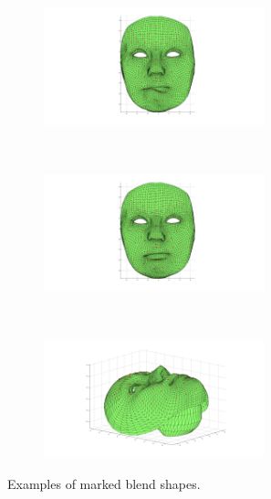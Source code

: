 \documentclass[11pt]{report}
\begin{document}
\begin{figure}[htbp!]
\begin{subfigure}[b]{0.3\textwidth}
        \end{subfigure} \\
        \begin{subfigure}[b]{0.3\textwidth}
                \includegraphics[trim = 160mm 20mm 160mm 10mm,clip,width=0.7\textwidth]{img/weights/3D/Emily_marked/blendshapeE_marked_61.png}
        \end{subfigure}%
        ~ %
        \begin{subfigure}[b]{0.3\textwidth}
                \includegraphics[trim = 160mm 20mm 160mm 10mm,clip,width=0.7\textwidth]{img/weights/3D/Emily_marked/blendshapeE_marked_67.png}
        \end{subfigure}
        ~ %
        \begin{subfigure}[b]{0.3\textwidth}
                \includegraphics[trim = 120mm 20mm 120mm 10mm, clip, width=0.7\textwidth]{img/weights/3D/Emily_marked/neutralE_marked_rot.png}
        \end{subfigure}
        \caption{Examples of marked blend shapes.}\label{fig:Emarked}
\end{figure}
\end{document}

